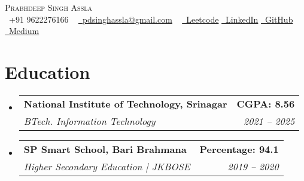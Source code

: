 \documentclass[letterpaper,11pt]{article}
\makeatletter
\newcommand{\resumeSubheading}[4]{
  \vspace{-2pt}\item
    \begin{tabular*}{1.0\textwidth}[t]{l@{\extracolsep{\fill}}r}
      \textbf{#1} & \textbf{\small #2} \\
      \textit{\small#3} & \textit{\small #4} \\
    \end{tabular*}\vspace{-7pt}
}
\newcommand{\resumeSubHeadingListStart}{\begin{itemize}[leftmargin=0.0in, label={}]}
\newcommand{\resumeSubHeadingListEnd}{\end{itemize}}
\makeatother
\begin{document}
\begin{center}
    {\Huge \scshape Prabhdeep Singh Assla} \\ \vspace{5pt}
    \small
    \raisebox{-0.1\height}\faPhone\ +91 9622276166 ~
    \href{mailto:sharma01ketan@gmail.com}{\faEnvelope\ pdsinghassla@gmail.com} ~
     \href{https://leetcode.com/u/sharma01ketan/}{\fa\ Leetcode}
     \href{https://www.linkedin.com/in/prabhdeep-singh-87536a223/}{\faGithub\ LinkedIn}
     \href{https://github.com/prabh1234assla}{\faGithub\ GitHub}
     \href{https://medium.com/@trustworthy1209}{\faGithub\ Medium}
    \vspace{-2pt}
\end{center}


\vspace{0pt}


\section{Education}
\resumeSubHeadingListStart
    \resumeSubheading
      {National Institute of Technology, Srinagar}{CGPA: 8.56}
      {BTech. Information Technology }{2021 -- 2025}
      
    \resumeSubheading
      {SP Smart School, Bari Brahmana}{Percentage: 94.1}
      {Higher Secondary Education | JKBOSE }{2019 -- 2020} 
      
  \resumeSubHeadingListEnd
\vspace{-15pt}

\end{document}
